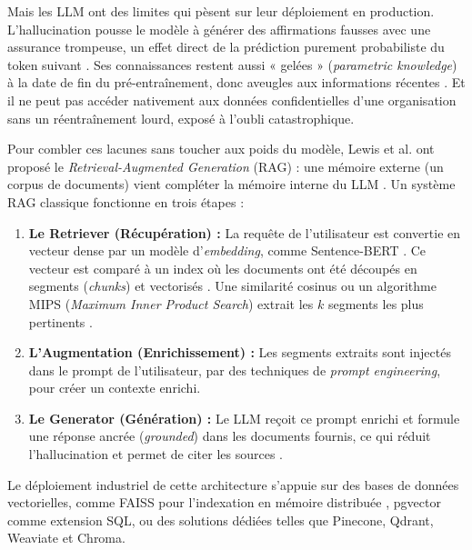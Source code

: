 Mais les LLM ont des limites qui pèsent sur leur déploiement en production. L'hallucination pousse le modèle à générer des affirmations fausses avec une assurance trompeuse, un effet direct de la prédiction purement probabiliste du token suivant \cite{gaoRetrievalAugmentedGenerationLarge2024}. Ses connaissances restent aussi « gelées » (\textit{parametric knowledge}) à la date de fin du pré-entraînement, donc aveugles aux informations récentes \cite{lewisRetrievalaugmentedGenerationKnowledgeintensive2020}. Et il ne peut pas accéder nativement aux données confidentielles d'une organisation sans un réentraînement lourd, exposé à l'oubli catastrophique.

Pour combler ces lacunes sans toucher aux poids du modèle, Lewis et al. \cite{lewisRetrievalaugmentedGenerationKnowledgeintensive2020} ont proposé le \textit{Retrieval-Augmented Generation} (RAG) : une mémoire externe (un corpus de documents) vient compléter la mémoire interne du LLM \cite{lewisRetrievalaugmentedGenerationKnowledgeintensive2020}. Un système RAG classique fonctionne en trois étapes \cite{gaoRetrievalAugmentedGenerationLarge2024} :
\begin{enumerate}
    \item \textbf{Le Retriever (Récupération) :} La requête de l'utilisateur est convertie en vecteur dense par un modèle d'\textit{embedding}, comme Sentence-BERT \cite{reimersSentencebertSentenceEmbeddings2019}. Ce vecteur est comparé à un index où les documents ont été découpés en segments (\textit{chunks}) et vectorisés \cite{karpukhinDensePassageRetrieval2020}. Une similarité cosinus ou un algorithme MIPS (\textit{Maximum Inner Product Search}) extrait les $k$ segments les plus pertinents \cite{karpukhinDensePassageRetrieval2020}.
    \item \textbf{L'Augmentation (Enrichissement) :} Les segments extraits sont injectés dans le prompt de l'utilisateur, par des techniques de \textit{prompt engineering}, pour créer un contexte enrichi.
    \item \textbf{Le Generator (Génération) :} Le LLM reçoit ce prompt enrichi et formule une réponse ancrée (\textit{grounded}) dans les documents fournis, ce qui réduit l'hallucination et permet de citer les sources \cite{lewisRetrievalaugmentedGenerationKnowledgeintensive2020}.
\end{enumerate}

Le déploiement industriel de cette architecture s'appuie sur des bases de données vectorielles, comme FAISS pour l'indexation en mémoire distribuée \cite{karpukhinDensePassageRetrieval2020}, pgvector comme extension SQL, ou des solutions dédiées telles que Pinecone, Qdrant, Weaviate et Chroma.

